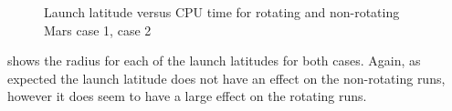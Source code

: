 \begin{figure}[H]
\centering
{} 
\caption{Launch latitude versus CPU time for rotating and non-rotating Mars \protect{} case 1,  \protect{} case 2 } 
\label{fig:launchLatitudeVsCPUcase1combined} 
\end{figure} 

 shows the radius for each of the launch latitudes for both cases. Again, as expected the launch latitude does not have an effect on the non-rotating runs, however it does seem to have a large effect on the rotating runs. 

